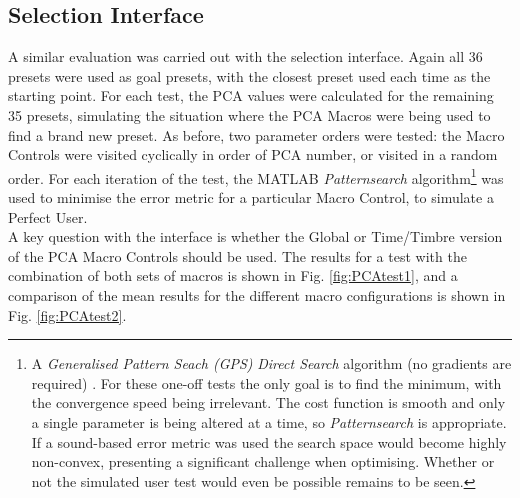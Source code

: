\documentclass[11pt, oneside]{report}   	%
\begin{document}
\subsection{Selection Interface}\label{sec:SelectionEval}
A similar evaluation was carried out with the selection interface. Again all 36 presets were used as goal presets, with the closest preset used each time as the starting point. For each test, the PCA values were calculated for the remaining 35 presets, simulating the situation where the PCA Macros were being used to find a brand new preset. As before, two parameter orders were tested: the Macro Controls were visited cyclically in order of PCA number, or visited in a random order. For each iteration of the test, the MATLAB \emph{Patternsearch} algorithm\footnote{A \emph{Generalised Pattern Seach (GPS)} \cite{GeneralisedPatternSearch} \emph{Direct Search} algorithm (no gradients are required) \cite{DirectSearch}. For these one-off tests the only goal is to find the minimum, with the convergence speed being irrelevant. The cost function is smooth and only a single parameter is being altered at a time, so \emph{Patternsearch} is appropriate. If a sound-based error metric was used the search space would become highly non-convex, presenting a significant challenge when optimising. Whether or not the simulated user test would even be possible remains to be seen.} was used to minimise the error metric for a particular Macro Control, to simulate a Perfect User.\\ 
A key question with the interface is whether the Global or Time/Timbre version of the PCA Macro Controls should be used. The results for a test with the combination of both sets of macros is shown in Fig. \ref{fig:PCAtest1}, and a comparison of the mean results for the different macro configurations is shown in Fig. \ref{fig:PCAtest2}.
\end{document}
